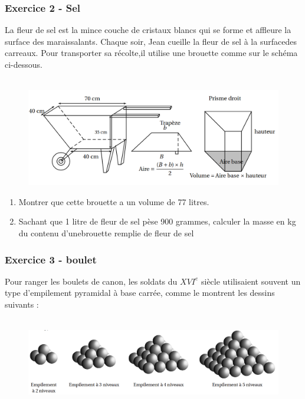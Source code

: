 \documentclass[11pt]{article}
\begin{document}
\subsubsection*{Exercice 2 - Sel}

La fleur de sel est la mince couche de cristaux blancs qui se forme et affleure la surface des maraissalants. Chaque soir, Jean cueille la fleur de sel à la surfacedes carreaux. Pour transporter sa récolte,il utilise une brouette comme sur le schéma ci-dessous.

\begin{figure}[H]
      \centering
      \includegraphics[width=0.8\linewidth]{3x3-volumes-1/sources/brouette.png}
\end{figure}

\begin{enumerate}
\item Montrer que cette brouette a un volume de 77 litres.
\item Sachant que 1 litre de fleur de sel pèse 900 grammes, calculer la masse en kg du contenu d’unebrouette remplie de fleur de sel
\end{enumerate}

\newpage

\subsubsection*{Exercice 3 - boulet}

Pour ranger les boulets de canon, les soldats du $XVI^e$ siècle utilisaient souvent un type d’empilement pyramidal à base carrée, comme le montrent les dessins suivants :

\begin{figure}[H]
      \centering
      \includegraphics[width=0.8\linewidth]{3x3-volumes-1/sources/boules.png}
\end{figure}
\end{document}
